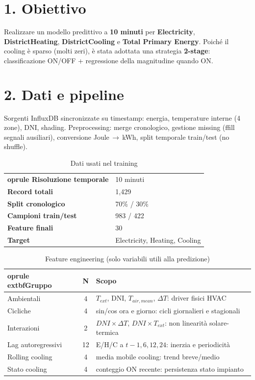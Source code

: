 \documentclass[11pt,a4paper]{article}
\author{}
\date{Marzo 2026}
\begin{document}
\maketitle
\vspace{-6mm}

\section*{1. Obiettivo}
Realizzare un modello predittivo a \textbf{10 minuti} per \textbf{Electricity}, \textbf{DistrictHeating}, \textbf{DistrictCooling} e \textbf{Total Primary Energy}.  
Poiché il cooling è sparso (molti zeri), è stata adottata una strategia \textbf{2-stage}: classificazione ON/OFF + regressione della magnitudine quando ON.

\section*{2. Dati e pipeline}
Sorgenti InfluxDB sincronizzate su timestamp: energia, temperature interne (4 zone), DNI, shading.  
Preprocessing: merge cronologico, gestione missing (ffill segnali ausiliari), conversione Joule\,$\to$\,kWh, split temporale train/test (no shuffle).

\begin{table}[H]
\centering
\small
\caption{Dati usati nel training}
\begin{tabular}{>{\bfseries}l l}
	oprule
Risoluzione temporale & 10 minuti \\
Record totali & 1,429 \\
Split cronologico & 70\% / 30\% \\
Campioni train/test & 983 / 422 \\
Feature finali & 30 \\
Target & Electricity, Heating, Cooling \\
\bottomrule
\end{tabular}
\end{table}

\begin{table}[H]
\centering
\small
\caption{Feature engineering (solo variabili utili alla predizione)}
\begin{tabular}{l c p{8.2cm}}
	oprule
	extbf{Gruppo} & \textbf{N} & \textbf{Scopo} \\
\midrule
Ambientali & 4 & $T_{ext}$, DNI, $T_{air,mean}$, $\Delta T$: driver fisici HVAC \\
Cicliche & 4 & sin/cos ora e giorno: cicli giornalieri e stagionali \\
Interazioni & 2 & $DNI\times\Delta T$, $DNI\times T_{ext}$: non linearità solare-termica \\
Lag autoregressivi & 12 & E/H/C a $t-1,6,12,24$: inerzia e periodicità \\
Rolling cooling & 4 & media mobile cooling: trend breve/medio \\
Stato cooling & 4 & conteggio ON recente: persistenza stato impianto \\
\bottomrule
\end{tabular}
\end{table}
\end{document}
